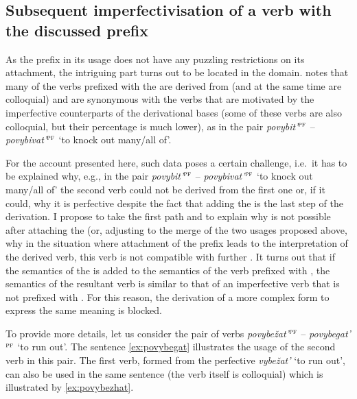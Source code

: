\subsection{Subsequent imperfectivisation of a verb with the discussed prefix}
As the prefix  in its  usage does not have any puzzling restrictions on its attachment, the intriguing part turns out to be located in the  domain. \citet[365]{Shvedova:82} notes that many of the verbs prefixed with the   are derived from  (and at the same time are colloquial) and are synonymous with the verbs that are motivated by the imperfective counterparts of the derivational bases (some of these verbs are also colloquial, but their percentage is much lower), as in the pair \textit{povybit'}$^{\textsc{pf}}$ -- \textit{povybivat'}$^{\textsc{pf}}$ `to knock out many/all of'.

For the account presented here, such data poses a certain challenge, i.e.\ it has to be explained why, e.g., in the pair \textit{povybit'}$^{\textsc{pf}}$ -- \textit{povybivat'}$^{\textsc{pf}}$ `to knock out many/all of' the second verb could not be derived from the first one or, if it could, why it is perfective despite the fact that adding the  is the last step of the derivation. I propose to take the first path and to explain why  is not possible after attaching the   (or, adjusting to the merge of the two usages proposed above, why in the situation where attachment of the prefix  leads to the  interpretation of the derived verb, this verb is not compatible with further . It turns out that if the semantics of the  is added to the semantics of the verb prefixed with  , the semantics of the resultant verb is similar to that of an imperfective verb that is not prefixed with . For this reason, the derivation of a more complex form to express the same meaning is blocked.

To provide more details, let us consider the pair of verbs \textit{povybe\v{z}at'}$^{\textsc{pf}}$ -- \textit{po\-vy\-be\-gat'}$^{\textsc{pf}}$ `to run out'. The sentence \ref{ex:povybegat} illustrates the usage of the second verb in this pair. The first verb, formed from the perfective  \textit{vybe\v{z}at'} `to run out', can also be used in the same sentence (the verb itself is colloquial) which is illustrated by \ref{ex:povybezhat}.

